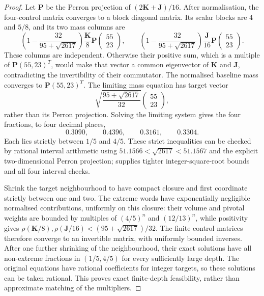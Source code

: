 \begin{proof}
Let $\mathbf P$ be the Perron projection of $(2\mathbf K+\mathbf J)/16$. After normalisation, the four-control matrix converges to a block diagonal matrix. Its scalar blocks are $4$ and $5/8$, and its two mass columns are
\[
 \left(1-\frac{32}{95+\sqrt{2617}}\right)
 \frac{\mathbf K}{8}\mathbf P\begin{pmatrix}55\\23\end{pmatrix},
 \qquad
 \left(1-\frac{32}{95+\sqrt{2617}}\right)
 \frac{\mathbf J}{16}\mathbf P\begin{pmatrix}55\\23\end{pmatrix}.
\]
These columns are independent. Otherwise their positive sum, which is a multiple of $\mathbf P(55,23)^T$, would make that vector a common eigenvector of $\mathbf K$ and $\mathbf J$, contradicting the invertibility of their commutator. The normalised baseline mass converges to $\mathbf P(55,23)^T$. The limiting mass equation has target vector
\[
 \sqrt{\frac{95+\sqrt{2617}}{32}}\begin{pmatrix}55\\23\end{pmatrix},
\]
rather than its Perron projection. Solving the limiting system gives the four fractions, to four decimal places,
\[
 0.3090,\qquad0.4396,\qquad0.3161,\qquad0.3304.
\]
Each lies strictly between $1/5$ and $4/5$. These strict inequalities can be checked by rational interval arithmetic using $51.1566<\sqrt{2617}<51.1567$ and the explicit two-dimensional Perron projection;  supplies tighter integer-square-root bounds and all four interval checks.

Shrink the target neighbourhood to have compact closure and first coordinate strictly between one and two. The extreme words have exponentially negligible normalised contributions, uniformly on this closure: their volume and pivotal weights are bounded by multiples of $(4/5)^n$ and $(12/13)^n$, while positivity gives
$\rho(\mathbf K/8),\rho(\mathbf J/16)<(95+\sqrt{2617})/32$.
The finite control matrices therefore converge to an invertible matrix, with uniformly bounded inverses. After one further shrinking of the neighbourhood, their exact solutions have all non-extreme fractions in $(1/5,4/5)$ for every sufficiently large depth. The original equations have rational coefficients for integer targets, so these solutions can be taken rational. This proves exact finite-depth feasibility, rather than approximate matching of the multipliers.


\end{proof}
